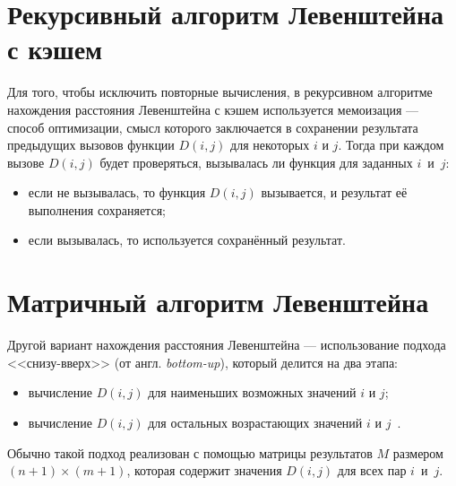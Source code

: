 \section{Рекурсивный алгоритм Левенштейна с кэшем}
Для того, чтобы исключить повторные вычисления, в рекурсивном алгоритме нахождения расстояния Левенштейна с кэшем используется мемоизация --- способ оптимизации, смысл которого заключается в сохранении результата предыдущих вызовов функции \(D(i, j)\) для некоторых \(i\) и \(j\). Тогда при каждом вызове \(D(i, j)\) будет проверяться, вызывалась ли функция для заданных \(i\)~и~\(j\):

\begin{itemize}[label=--]
    \item если не вызывалась, то функция \(D(i, j)\) вызывается, и результат её выполнения сохраняется;
    \item если вызывалась, то используется сохранённый результат.
\end{itemize}

\section{Матричный алгоритм Левенштейна}\label{sec:matrix_lev}

Другой вариант нахождения расстояния Левенштейна --- использование подхода <<снизу-вверх>> (от англ. \textit{bottom-up}), который делится на два этапа:

\begin{itemize}[label=--]
    \item вычисление \(D(i, j)\) для наименьших возможных значений \(i\) и \(j\);
    \item вычисление \(D(i, j)\) для остальных возрастающих значений \(i\) и \(j\)~\cite{cambridge}.
\end{itemize}

Обычно такой подход реализован с помощью матрицы результатов \(M\) размером \((n + 1) \times (m + 1)\), которая содержит значения \(D(i, j)\) для всех пар \(i\)~и~\(j\).

